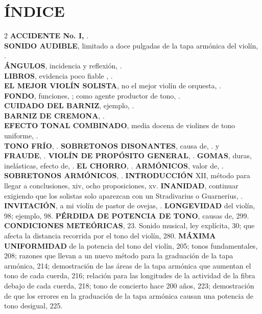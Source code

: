 \chapter*{ÍNDICE}
\begin{multicols}{2}
\textbf{ACCIDENTE No. I,}  \pageref{accidente}. \\
\textbf{SONIDO AUDIBLE}, limitado a doce pulgadas de la tapa armónica del violín, \pageref{sonido_audible}.\\
\textbf{ÁNGULOS}, incidencia y reflexión, \pageref{angulos}.\\
\textbf{LIBROS}, evidencia poco fiable , \pageref{libros}.\\
\textbf{EL MEJOR VIOLÍN SOLISTA}, no el mejor violín de orquesta, \pageref{mejor_violin}.\\
\textbf{FONDO}, funciones, \pageref{plancha_fondo}; como agente productor de tono, \pageref{plancha_tono}.\\
\textbf{CUIDADO DEL BARNIZ}, ejemplo, \pageref{cuidado_barniz}.\\
\textbf{BARNIZ DE CREMONA}, \pageref{barniz_cremona}.\\
\textbf{EFECTO TONAL COMBINADO}, media docena de violines de tono uniforme, \pageref{efecto_tonal}.\\
\textbf{TONO FRÍO}, \pageref{tono_frio}.
\textbf{SOBRETONOS DISONANTES}, causa de, \pageref{sobretonos_dis}. y \pageref{sobretonos_dis2}\\
\textbf{FRAUDE}, \pageref{fraude}.
\textbf{VIOLÍN DE PROPÓSITO GENERAL}, \pageref{violin_general}.
\textbf{GOMAS}, duras, inelásticas, efecto de, \pageref{gomas}.
\textbf{EL CHORRO}, \pageref{chorro}.
\textbf{ARMÓNICOS}, valor de, \pageref{armonicos}.
\textbf{SOBRETONOS ARMÓNICOS}, \pageref{sobretonos_arm}.
\textbf{INTRODUCCIÓN} XII, método para llegar a conclusiones, xiv, ocho proposiciones, xv.
\textbf{INANIDAD}, continuar exigiendo que los solistas solo aparezcan con un Stradivarius o Guarnerius, \pageref{inanidad}.
\textbf{INVITACIÓN}, a mi violín de pastor de ovejas, \pageref{invitacion}.
\textbf{LONGEVIDAD} del violín, 98; ejemplo, 98.
\textbf{PÉRDIDA DE POTENCIA DE TONO}, causas de, 299.
\textbf{CONDICIONES METEÓRICAS}, 23. Sonido musical, ley explícita, 30; que afecta la distancia recorrida por el tono del violín, 280.
\textbf{MÁXIMA UNIFORMIDAD} de la potencia del tono del violín, 205; tonos fundamentales, 208; razones que llevan a un nuevo método para la graduación de la tapa armónica, 214; demostración de las áreas de la tapa armónica que aumentan el tono de cada cuerda, 216; relación para las longitudes de la actividad de la fibra debajo de cada cuerda, 218; tono de concierto hace 200 años, 223; demostración de que los errores en la graduación de la tapa armónica causan una potencia de tono desigual, 225.

\end{multicols}
